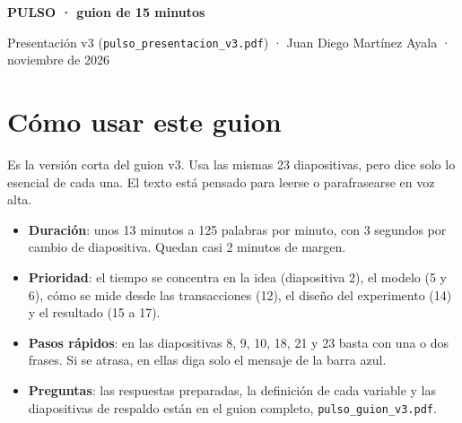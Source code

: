 \documentclass[11pt,a4paper,oneside]{article}
\begin{document}
\begin{center}
{\sffamily\bfseries\huge\color{azul} PULSO · guion de 15 minutos\par}
\vspace{0.2cm}
{\sffamily\color{gris} Presentación v3 (\texttt{pulso\_presentacion\_v3.pdf}) ·
Juan Diego Martínez Ayala · noviembre de 2026\par}
\end{center}

\section{Cómo usar este guion}

Es la versión corta del guion v3. Usa las mismas 23 diapositivas, pero dice solo lo
esencial de cada una. El texto está pensado para leerse o parafrasearse en voz alta.

\begin{itemize}
\item \textbf{Duración}: unos 13 minutos a 125 palabras por minuto, con 3 segundos por
cambio de diapositiva. Quedan casi 2 minutos de margen.
\item \textbf{Prioridad}: el tiempo se concentra en la idea (diapositiva 2), el modelo
(5 y 6), cómo se mide desde las transacciones (12), el diseño del experimento (14) y el
resultado (15 a 17).
\item \textbf{Pasos rápidos}: en las diapositivas 8, 9, 10, 18, 21 y 23 basta con una o
dos frases. Si se atrasa, en ellas diga solo el mensaje de la barra azul.
\item \textbf{Preguntas}: las respuestas preparadas, la definición de cada variable y las
diapositivas de respaldo están en el guion completo, \texttt{pulso\_guion\_v3.pdf}.
\end{itemize}
\end{document}
